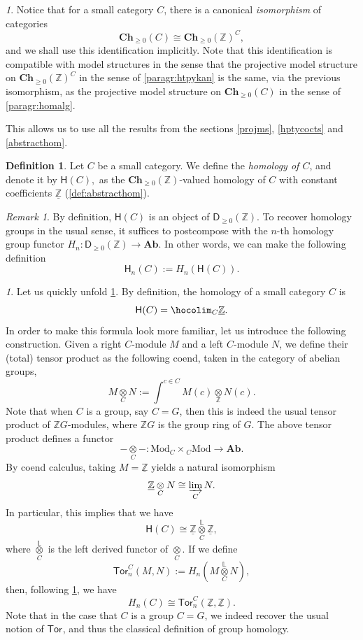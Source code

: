 \documentclass[reqno]{amsart}
\theoremstyle{plain}
\theoremstyle{definition}
\newtheorem{definition}[subsubsection]{Definition}
\theoremstyle{remark}
\newtheorem{remark}[subsubsection]{Remark}
\newtheorem{paragr}[subsubsection]{} %
\newcommand{\nmbr}[1]{\mathbb #1}
\newcommand{\Z}{\nmbr{Z}}
\newcommand{\ilim}{\varinjlim} %
\newcommand{\fun}[2]{{#2}^{#1}} %
\newcommand{\ctg}[1]{\mathbf{#1}}  %
\newcommand{\Ch}[1]{\ctg{Ch}_{#1}} %
\newcommand{\Chp}{\Ch{\geq 0}} %
\newcommand{\Ab}{\ctg{Ab}} %
\newcommand{\RMod}[1]{\mathrm{Mod}_{#1}} %
\newcommand{\LMod}[1]{{}_{#1}\mathrm{Mod}} %
\newcommand{\functor}[1]{\mathsf{#1}} %
\newcommand{\tens}[1]{\underset{#1}{\otimes}} %
\newcommand{\Ltens}[1]{\overset{\LL}{\tens{#1}}} %
\newcommand{\Tor}[2]{\functor{Tor}^{#1}_{#2}} %
\newcommand{\cst}[1]{\underline{#1}} %
\newcommand{\Ho}{\functor{H}} %
\newcommand{\LL}{\mathbb{L}} %
\newcommand{\Derp}[1]{\functor{D}_{\geq 0}(#1)}
\newcommand{\nbd}{\nobreakdash} %
\begin{document}
\begin{paragr}
   Notice that for a small category $C$, there is a canonical
   \emph{isomorphism} of categories
  \[
    \Chp(C)\cong \fun{C}{\Chp(\Z)},
  \]
  and we shall use this identification implicitly. Note that this
  identification is compatible with model structures in the sense that
  the projective model structure on $\fun{C}{\Chp(\Z)}$ in the sense
  of \ref{paragr:htpykan} is the same, via the previous isomorphism,
  as the projective model structure on $\Chp(C)$ in the sense of
  \ref{paragr:homalg}.

  This allows us to use all the results from the sections
  \ref{projms}, \ref{hptycocts} and \ref{abstracthom}. 
\end{paragr}
\begin{definition}\label{def:classicalhomology}
  Let $C$ be a small category. We define
  the \emph{homology of $C$}, and denote it by
    $\Ho(C),$
  as the $\Chp(\Z)$\nbd-valued homology of $C$ with constant coefficients $\cst{\Z}$
  (\cref{def:abstracthom}).
\end{definition}
\begin{remark}\label{remark:homologygroups}
  By definition, $\Ho(C)$ is an object of $\Derp{\Z}$. To recover
  homology groups in the usual sense, it suffices to postcompose with the $n$-th
  homology group functor $H_n \colon \Derp{\Z}\to \Ab$. In other
  words, we can make the following definition
  \[
    \Ho_n(C):=H_n(\Ho(C)).
  \]
\end{remark}
\begin{paragr}
  Let us quickly unfold \cref{def:classicalhomology}. By definition,
  the homology of a small category $C$ is
  \[
    \Ho(C)=\hocolim_C\cst{\Z}.
  \]
  In order to make this formula look more familiar, let us introduce
  the following construction. Given a right $C$\nbd-module $M$ and a left $C$\nbd-module $N$, we define their (total) tensor product as
  the following coend, taken in the category of abelian groups,
  \[
    M\tens{C}N:=\int^{c \in C}M(c)\tens{\Z} N(c).
  \]
  Note that when $C$ is a group, say $C=G$, then this is indeed the usual
  tensor product of $\Z G$\nbd-modules, where $\Z G$ is the group ring
  of $G$. The above tensor product defines a functor
  \[
    -\tens{C}-\colon \RMod{C} \times \LMod{C} \to \Ab.
  \]
  By coend calculus, taking $M=\cst{\Z}$ yields a
  natural isomorphism
  \[
    \cst{\Z}\tens{C}N \cong \ilim_C N.
  \]
  In particular, this implies that we have
  \[
    \Ho(C)\cong \cst{\Z} \Ltens{C} \cst{\Z},
  \]
  where $\Ltens{C}$ is the left derived functor of
  $\tens{C}$. If we define
  \[
    \Tor{C}{n}(M,N):=H_n(M \Ltens{C} N),
  \]
  then, following \cref{remark:homologygroups}, we have
  \[
    H_n(C)\cong \Tor{C}{n}(\cst{\Z},\cst{\Z}).
  \]
  Note that in the case that $C$ is a group $C=G$, we indeed recover
  the usual notion of $\Tor{}{}$, and thus the classical definition of
  group homology.
\end{paragr}
\end{document}
